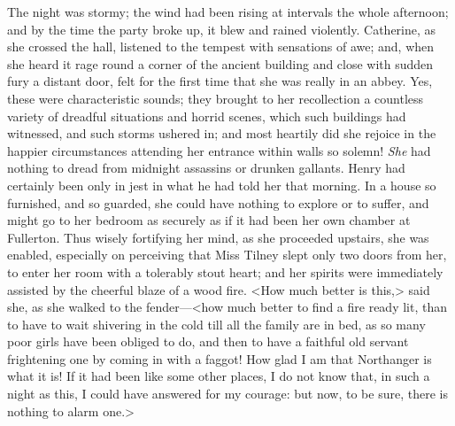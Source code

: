 The night was stormy; the wind had been rising at intervals the whole afternoon; and by the time the party broke up, it blew and rained violently. Catherine, as she crossed the hall, listened to the tempest with sensations of awe; and, when she heard it rage round a corner of the ancient building and close with sudden fury a distant door, felt for the first time that she was really in an abbey. Yes, these were characteristic sounds; they brought to her recollection a countless variety of dreadful situations and horrid scenes, which such buildings had witnessed, and such storms ushered in; and most heartily did she rejoice in the happier circumstances attending her entrance within walls so solemn! \textit{She} had nothing to dread from midnight assassins or drunken gallants. Henry had certainly been only in jest in what he had told her that morning. In a house so furnished, and so guarded, she could have nothing to explore or to suffer, and might go to her bedroom as securely as if it had been her own chamber at Fullerton. Thus wisely fortifying her mind, as she proceeded upstairs, she was enabled, especially on perceiving that Miss Tilney slept only two doors from her, to enter her room with a tolerably stout heart; and her spirits were immediately assisted by the cheerful blaze of a wood fire. <How much better is this,> said she, as she walked to the fender—<how much better to find a fire ready lit, than to have to wait shivering in the cold till all the family are in bed, as so many poor girls have been obliged to do, and then to have a faithful old servant frightening one by coming in with a faggot! How glad I am that Northanger is what it is! If it had been like some other places, I do not know that, in such a night as this, I could have answered for my courage: but now, to be sure, there is nothing to alarm one.> 

